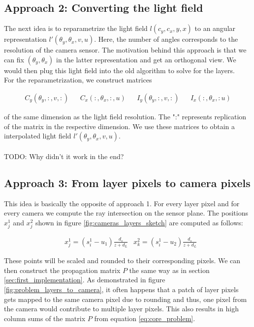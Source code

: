 \documentclass[11pt,a4paper,titlepage]{article}
\begin{document}
\subsection{Approach 2: Converting the light field}
The next idea is to reparametrize the light field $l \left( c_y, c_x, y, x \right)$ to an angular representation $l' \left( \theta_y, \theta_x, v, u \right)$. Here, the number of angles corresponds to the resolution of the camera sensor. The motivation behind this approach is that we can fix 
$\left( \theta_y, \theta_x \right)$ in the latter representation and get an orthogonal view. We would then plug this light field into the old algorithm to solve for the layers.
\\
For the reparametrization, we construct matrices

\begin{align*}
	C_y \left( \theta_y, :, v, : \right) && C_x \left( :, \theta_x, :, u \right) && I_y \left(\theta_y, :, v, : \right) && I_x \left( :, \theta_x, : u \right) 
\end{align*}

of the same dimension as the light field resolution. The ":" represents replication of the matrix in the respective dimension. We use these matrices to obtain a interpolated light field $l' \left( \theta_y, \theta_x, v, u \right)$.
\\\\ TODO: Why didn't it work in the end? 

\subsection{Approach 3: From layer pixels to camera pixels}
This idea is basically the opposite of approach 1. For every layer pixel and for every camera we compute the ray intersection on the sensor plane. The positions $x_j^1$ and $x_j^2$ shown in figure \ref{fig:cameras_layers_sketch} are computed as follows:

\begin{align*}
	& x_j^1 = \left( s_i^1 - u_1 \right) \frac{d_s}{z + d_L} & x_k^2 = \left( s_i^1 - u_2 \right) \frac{d_s}{z + d_L}
\end{align*}

These points will be scaled and rounded to their corresponding pixels. We can then construct the propagation matrix $P$ the same way as in section \ref{sec:first_implementation}.
As demonstrated in figure \ref{fig:problem_layers_to_camera}, it often happens that a patch of layer pixels gets mapped to the same camera pixel due to rounding and thus, one pixel from the camera would contribute to multiple layer pixels. This also results in high column sums of the matrix $P$ from equation \ref{eq:core_problem}.
\end{document}

